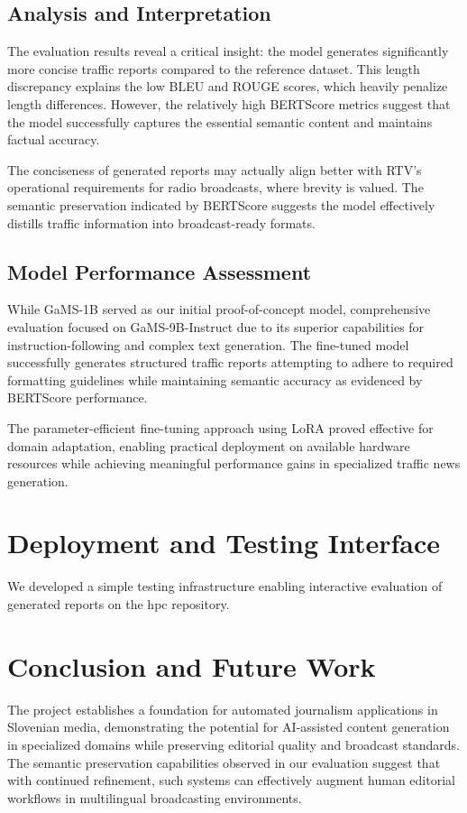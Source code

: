 \documentclass[fleqn,moreauthors,10pt]{ds_report}
\begin{document}
\subsection*{Analysis and Interpretation}
The evaluation results reveal a critical insight: the model generates significantly more concise traffic reports compared to the reference dataset. This length discrepancy explains the low BLEU and ROUGE scores, which heavily penalize length differences. However, the relatively high BERTScore metrics suggest that the model successfully captures the essential semantic content and maintains factual accuracy.

The conciseness of generated reports may actually align better with RTV's operational requirements for radio broadcasts, where brevity is valued. The semantic preservation indicated by BERTScore suggests the model effectively distills traffic information into broadcast-ready formats.

\subsection*{Model Performance Assessment}
While GaMS-1B served as our initial proof-of-concept model, comprehensive evaluation focused on GaMS-9B-Instruct due to its superior capabilities for instruction-following and complex text generation. The fine-tuned model successfully generates structured traffic reports attempting to adhere to required formatting guidelines while maintaining semantic accuracy as evidenced by BERTScore performance.

The parameter-efficient fine-tuning approach using LoRA proved effective for domain adaptation, enabling practical deployment on available hardware resources while achieving meaningful performance gains in specialized traffic news generation.

\section*{Deployment and Testing Interface}

We developed a simple testing infrastructure enabling interactive evaluation of generated reports on the hpc repository.

\section*{Conclusion and Future Work}

The project establishes a foundation for automated journalism applications in Slovenian media, demonstrating the potential for AI-assisted content generation in specialized domains while preserving editorial quality and broadcast standards. The semantic preservation capabilities observed in our evaluation suggest that with continued refinement, such systems can effectively augment human editorial workflows in multilingual broadcasting environments.
\end{document}
